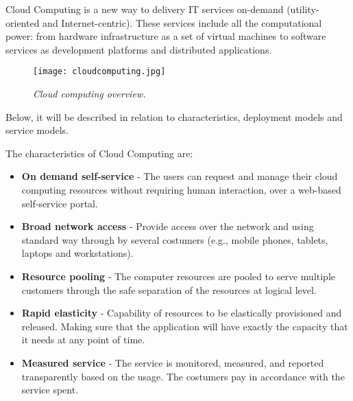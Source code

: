 Cloud Computing is a new way to delivery IT services on-demand (utility-oriented and Internet-centric). These services include all the computational power: from hardware infrastructure as a set of virtual machines to software services as development platforms and distributed applications.

\begin{figure}[!ht]
\begin{center}
\texttt{[image: cloudcomputing.jpg]}
\caption{\small \sl Cloud computing overview.\label{fig:cloudcomputing}}
\end{center}
\end{figure}

Below, it will be described in relation to characteristics, deployment models and service models\cite{schouten2013ibm}.

The characteristics of Cloud Computing are:
\begin{itemize}
	\item \textbf{On demand self-service} 	- The users can request and manage their cloud computing resources without requiring human interaction, over a web-based self-service portal.
	\item \textbf{Broad network access 	}	- Provide access over the network and using standard way through by several costumers (e.g., mobile phones, tablets, laptops and workstations).
	\item \textbf{Resource pooling 		}	- The computer resources are pooled to serve multiple customers through the safe separation of the resources at logical level.
	\item \textbf{Rapid elasticity 		}	- Capability of resources to be elastically provisioned and released. Making sure that the application will have exactly the capacity that it needs at any point of time.
	\item \textbf{Measured service 		}	- The service is monitored, measured, and reported transparently based on the usage. The costumers pay in accordance with the service spent.
\end{itemize}

